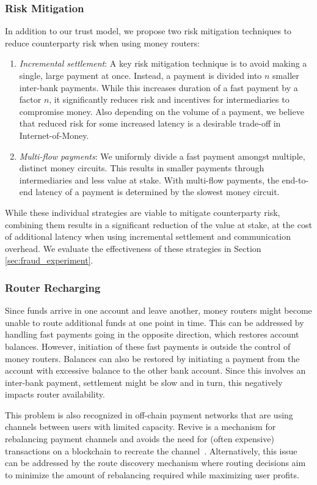\subsubsection*{Risk Mitigation}
In addition to our trust model, we propose two risk mitigation techniques to reduce counterparty risk when using money routers:
\begin{enumerate}
	\item \emph{Incremental settlement}: A key risk mitigation technique is to avoid making a single, large payment at once. Instead, a payment is divided into $ n $ smaller inter-bank payments. While this increases duration of a fast payment by a factor $ n $, it significantly reduces risk and incentives for intermediaries to compromise money. Also depending on the volume of a payment, we believe that reduced risk for some increased latency is a desirable trade-off in Internet-of-Money.
	\item \emph{Multi-flow payments}: We uniformly divide a fast payment amongst multiple, distinct money circuits. This results in smaller payments through intermediaries and less value at stake. With multi-flow payments, the end-to-end latency of a payment is determined by the slowest money circuit.
\end{enumerate}
While these individual strategies are viable to mitigate counterparty risk, combining them results in a significant reduction of the value at stake, at the cost of additional latency when using incremental settlement and communication overhead.
We evaluate the effectiveness of these strategies in Section \ref{sec:fraud_experiment}.

\subsubsection*{Router Recharging}
\label{sec:router_recharging}
Since funds arrive in one account and leave another, money routers might become unable to route additional funds at one point in time.
This can be addressed by handling fast payments going in the opposite direction, which restores account balances.
However, initiation of these fast payments is outside the control of money routers.
Balances can also be restored by initiating a payment from the account with excessive balance to the other bank account.
Since this involves an inter-bank payment, settlement might be slow and in turn, this negatively impacts router availability.

This problem is also recognized in off-chain payment networks that are using channels between users with limited capacity.
Revive is a mechanism for rebalancing payment channels and avoids the need for (often expensive) transactions on a blockchain to recreate the channel~\cite{khalil2017revive}.
Alternatively, this issue can be addressed by the route discovery mechanism where routing decisions aim to minimize the amount of rebalancing required while maximizing user profits.

